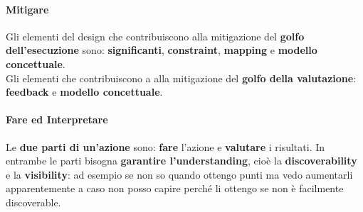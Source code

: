 \documentclass[10pt]{article}
\begin{document}
\paragraph{Mitigare} Gli elementi del design che contribuiscono alla mitigazione del \textbf{golfo dell'esecuzione} sono: \textbf{significanti}, \textbf{constraint}, \textbf{mapping} e \textbf{modello concettuale}.\\
Gli elementi che contribuiscono a alla mitigazione del \textbf{golfo della valutazione}: \textbf{feedback} e \textbf{modello concettuale}.
\paragraph{Fare ed Interpretare} Le \textbf{due parti di un'azione} sono: \textbf{fare} l'azione e \textbf{valutare} i risultati. In entrambe le parti bisogna \textbf{garantire l'understanding}, cioè la \textbf{discoverability} e la \textbf{visibility}: ad esempio se non so quando ottengo punti ma vedo aumentarli apparentemente a caso non posso capire perché li ottengo se non è facilmente discoverable.
\end{document}
